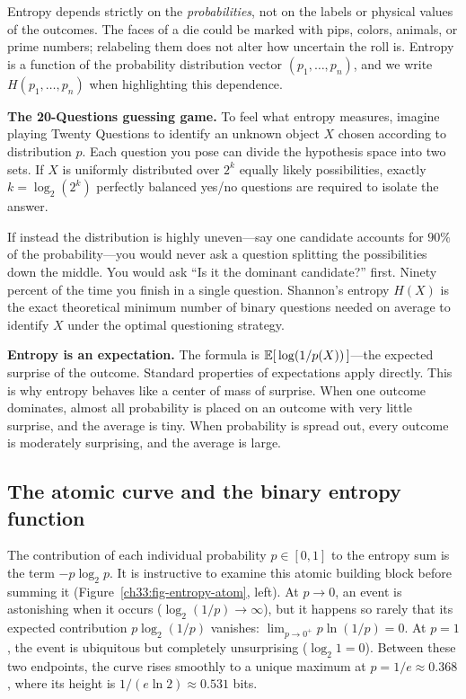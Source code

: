 Entropy depends strictly on the \emph{probabilities}, not on the labels or physical values of the outcomes. The faces of a die could be marked with pips, colors, animals, or prime numbers; relabeling them does not alter how uncertain the roll is. Entropy is a function of the probability distribution vector $(p_1, \dots, p_n)$, and we write $H(p_1, \dots, p_n)$ when highlighting this dependence.

\begin{intuitionbox}
\textbf{The 20-Questions guessing game.}
To feel what entropy measures, imagine playing Twenty Questions to identify an unknown object $X$ chosen according to distribution $p$. Each question you pose can divide the hypothesis space into two sets. If $X$ is uniformly distributed over $2^k$ equally likely possibilities, exactly $k = \log_2(2^k)$ perfectly balanced yes/no questions are required to isolate the answer.

If instead the distribution is highly uneven---say one candidate accounts for $90\%$ of the probability---you would never ask a question splitting the possibilities down the middle. You would ask ``Is it the dominant candidate?'' first. Ninety percent of the time you finish in a single question. Shannon's entropy $H(X)$ is the exact theoretical minimum number of binary questions needed on average to identify $X$ under the optimal questioning strategy.
\end{intuitionbox}

\begin{happeningbox}
\textbf{Entropy is an expectation.} The formula is
$\operatorname{\mathbb{E}}[\,\log(1/p(X))\,]$---the expected surprise of the outcome. Standard properties of
expectations apply directly. This is why entropy behaves like a center of mass of
surprise. When one outcome dominates, almost all probability is placed on an outcome with very little
surprise, and the average is tiny. When probability is spread out, every outcome is moderately
surprising, and the average is large.
\end{happeningbox}

\subsection{The atomic curve and the binary entropy function}

The contribution of each individual probability $p \in [0,1]$ to the entropy sum is the term $-p\log_2 p$. It is instructive to examine this atomic building block before summing it (Figure~\ref{ch33:fig-entropy-atom}, left). At $p \to 0$, an event is astonishing when it occurs ($\log_2(1/p) \to \infty$), but it happens so rarely that its expected contribution $p\log_2(1/p)$ vanishes: $\lim_{p\to 0^+} p\ln(1/p) = 0$. At $p = 1$, the event is ubiquitous but completely unsurprising ($\log_2 1 = 0$). Between these two endpoints, the curve rises smoothly to a unique maximum at $p = 1/e \approx 0.368$, where its height is $1/(e\ln 2) \approx 0.531$ bits.

